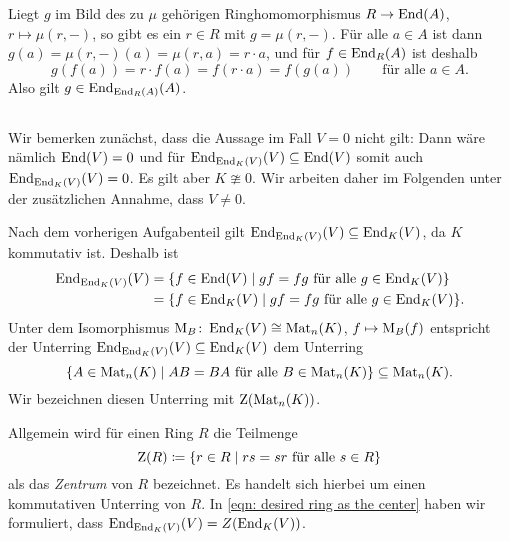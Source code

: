 \documentclass[a4paper, 10pt, numbers=noenddot]{scrartcl}
\begin{document}
Liegt $g$ im Bild des zu $\mu$ gehörigen Ringhomomorphismus $R \to \operatorname{End}(A)$, $r \mapsto \mu(r, -)$, so gibt es ein $r \in R$ mit $g = \mu(r, -)$.
Für alle $a \in A$ ist dann $g(a) = \mu(r,-)(a) = \mu(r,a) = r \cdot a$, und für $f \in \operatorname{End}_R(A)$ ist deshalb
\[
    g(f(a))
  = r \cdot f(a)
  = f(r \cdot a)
  = f(g(a))
  \qquad
  \text{für alle $a \in A$}.
\]
Also gilt $g \in \operatorname{End}_{\operatorname{End}_R(A)}(A)$.





\subsection{}







\subsection{}

Wir bemerken zunächst, dass die Aussage im Fall $V = 0$ nicht gilt:
Dann wäre nämlich $\operatorname{End}(V) = 0$ und für $\operatorname{End}_{\operatorname{End}_K(V)}(V) \subseteq \operatorname{End}(V)$ somit auch $\operatorname{End}_{\operatorname{End}_K(V)}(V) = 0$.
Es gilt aber $K \ncong 0$.
Wir arbeiten daher im Folgenden unter der zusätzlichen Annahme, dass $V \neq 0$.

Nach dem vorherigen Aufgabenteil gilt $\operatorname{End}_{\operatorname{End}_K(V)}(V) \subseteq \operatorname{End}_K(V)$, da $K$ kommutativ ist.
Deshalb ist
\begin{equation}
  \label{eqn: desired ring as the center}
  \begin{aligned}
        \operatorname{End}_{\operatorname{End}_K(V)}(V)
    &=  \{
          f \in \operatorname{End}(V)
        \mid
          \text{$gf = fg$ für alle $g \in \operatorname{End}_K(V)$}
        \}
    \\
    &=  \{
          f \in \operatorname{End}_K(V)
        \mid
          \text{$gf = fg$ für alle $g \in \operatorname{End}_K(V)$}
        \}.
  \end{aligned}
\end{equation}
Unter dem Isomorphismus $\operatorname{M}_B \colon \operatorname{End}_K(V) \cong \operatorname{Mat}_n(K)$, $f \mapsto \operatorname{M}_B(f)$ entspricht der Unterring $\operatorname{End}_{\operatorname{End}_K(V)}(V) \subseteq \operatorname{End}_K(V)$ dem Unterring
\[
            \{
              A \in \operatorname{Mat}_n(K)
            \mid
              \text{$AB = BA$ für alle $B \in \operatorname{Mat}_n(K)$}
            \}
  \subseteq \operatorname{Mat}_n(K).
\]
Wir bezeichnen diesen Unterring mit $\operatorname{Z}(\operatorname{Mat}_n(K))$.

\begin{remark}
  Allgemein wird für einen Ring $R$ die Teilmenge
  \[
              \operatorname{Z}(R)
    \coloneqq \{ r \in R \mid \text{$rs = sr$ für alle $s \in R$} \}
  \]
  als das \emph{Zentrum} von $R$ bezeichnet.
  Es handelt sich hierbei um einen kommutativen Unterring von $R$.
  In \eqref{eqn: desired ring as the center} haben wir formuliert, dass $\operatorname{End}_{\operatorname{End}_K(V)}(V) = Z(\operatorname{End}_K(V))$.
\end{remark}
\end{document}
